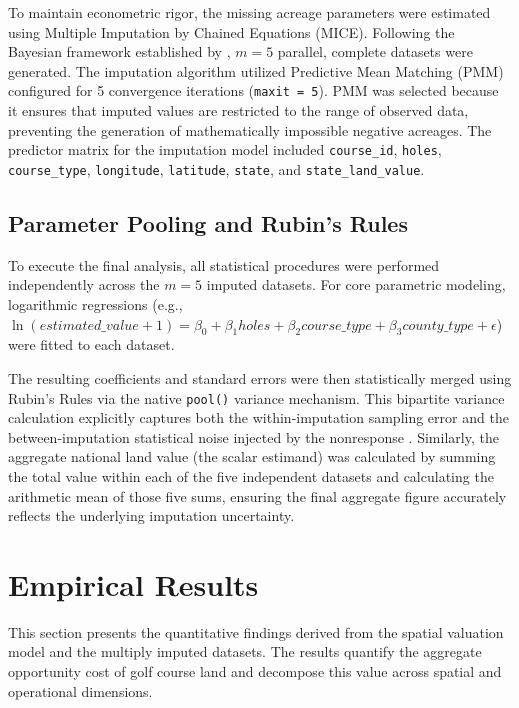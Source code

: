 \documentclass[10pt, letterpaper]{article}
\begin{document}
To maintain econometric rigor, the missing acreage parameters were estimated using Multiple Imputation by Chained Equations (MICE). Following the Bayesian framework established by \textcite{Rubin1987}, $m = 5$ parallel, complete datasets were generated. The imputation algorithm utilized Predictive Mean Matching (PMM) configured for 5 convergence iterations (\texttt{maxit = 5}). PMM was selected because it ensures that imputed values are restricted to the range of observed data, preventing the generation of mathematically impossible negative acreages. The predictor matrix for the imputation model included \texttt{course\_id}, \texttt{holes}, \texttt{course\_type}, \texttt{longitude}, \texttt{latitude}, \texttt{state}, and \texttt{state\_land\_value}.

\subsection{Parameter Pooling and Rubin's Rules}
To execute the final analysis, all statistical procedures were performed independently across the $m=5$ imputed datasets. For core parametric modeling, logarithmic regressions (e.g., $\ln(estimated\_value + 1) = \beta_0 + \beta_1 holes + \beta_2 course\_type + \beta_3 county\_type + \epsilon$) were fitted to each dataset. 

The resulting coefficients and standard errors were then statistically merged using Rubin's Rules via the native \texttt{pool()} variance mechanism. This bipartite variance calculation explicitly captures both the within-imputation sampling error and the between-imputation statistical noise injected by the nonresponse \parencite{Burren2018}. Similarly, the aggregate national land value (the scalar estimand) was calculated by summing the total value within each of the five independent datasets and calculating the arithmetic mean of those five sums, ensuring the final aggregate figure accurately reflects the underlying imputation uncertainty.

\newpage

\section{Empirical Results}

This section presents the quantitative findings derived from the spatial valuation model and the multiply imputed datasets. The results quantify the aggregate opportunity cost of golf course land and decompose this value across spatial and operational dimensions.
\end{document}
